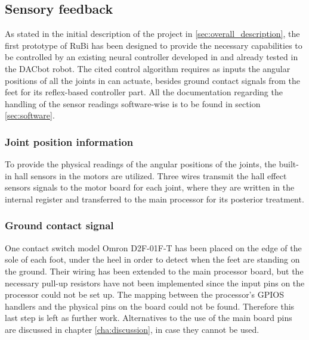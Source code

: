 
\subsection{Sensory feedback} %
\label{sub:sensory_feedback}
As stated in the initial description of the project in \ref{sec:overall_description}, the first prototype of RuBi has been designed to provide the necessary capabilities to be controlled by an existing neural controller developed in \cite{dacbot1} and already tested in the DACbot robot.
The cited control algorithm requires as inputs the angular positions of all the joints in can actuate, besides ground contact signals from the feet for its reflex-based controller part.
All the documentation regarding the handling of the sensor readings software-wise is to be found in section \ref{sec:software}.


\subsubsection{Joint position information} %
\label{ssub:joint_position_feedback}
To provide the physical readings of the angular positions of the joints, the built-in hall sensors in the motors are utilized. 
Three wires transmit the hall effect sensors signals to the motor board for each joint, where they are written in the internal register and transferred to the main processor for its posterior treatment.

\subsubsection{Ground contact signal} %
\label{ssub:ground_contact_feedback}
One contact switch model Omron D2F-01F-T has been placed on the edge of the sole of each foot, under the heel in order to detect when the feet are standing on the ground. 
Their wiring has been extended to the main processor board, but the necessary pull-up resistors have not been implemented since the input pins on the processor could not be set up.
The mapping between the processor's GPIOS handlers and the physical pins on the board could not be found.
Therefore this last step is left as further work.
Alternatives to the use of the main board pins are discussed in chapter \ref{cha:discussion}, in case they cannot be used.


